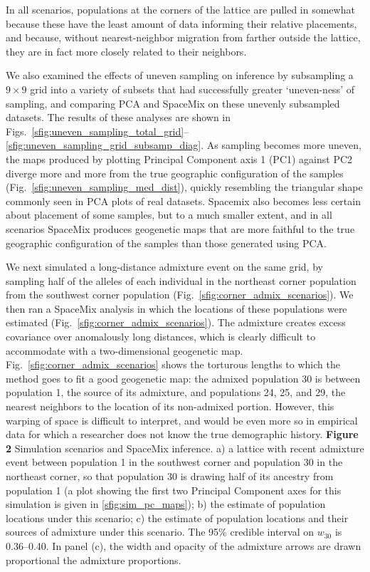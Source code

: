 \documentclass[10pt,letterpaper]{article}
\begin{document}
In all scenarios, populations at the corners of the lattice are pulled in somewhat
because these have the least amount of data informing their relative placements, and because, without nearest-neighbor migration from farther outside the lattice, they are in fact more closely related to their neighbors.  

We also examined the effects of uneven sampling on inference by 
subsampling a $9\times9$ grid into a variety of subsets that had successfully greater `uneven-ness' of sampling,
and comparing PCA and SpaceMix on these unevenly subsampled datasets.
The results of these analyses are shown in Figs.\ \ref{sfig:uneven_sampling_total_grid}--\ref{sfig:uneven_sampling_grid_subsamp_diag}.  
As sampling becomes more uneven,
the maps produced by plotting Principal Component axis 1 (PC1) against PC2 diverge more and more from 
the true geographic configuration of the samples (Fig.\ \ref{sfig:uneven_sampling_med_dist}),
quickly resembling the triangular shape commonly seen in PCA plots of real datasets.
Spacemix also becomes less certain about placement of some samples,
but to a much smaller extent, and in all scenarios SpaceMix produces geogenetic maps that are more 
faithful to the true geographic configuration of the samples than those generated using PCA. 

We next simulated a long-distance admixture event on the same grid,
by sampling half of the alleles of each individual in the northeast corner population from the southwest corner population (Fig.\ \ref{sfig:corner_admix_scenarios}).  We then ran a SpaceMix analysis in which the locations of these populations were estimated (Fig.\ \ref{sfig:corner_admix_scenarios}).
The admixture creates excess covariance over anomalously long distances, which is clearly difficult to accommodate with a two-dimensional geogenetic map.
Fig.\ \ref{sfig:corner_admix_scenarios} shows the torturous lengths to which the method goes to fit a good geogenetic map: the admixed population 30 is between population 1, the source of its admixture, and populations 24, 25, and 29, the nearest neighbors to the location of its non-admixed portion.
However, this warping of space is difficult to interpret, and would be even more so in empirical data for which a researcher does not know the true demographic history.  
%
\newline\newline
{\bf{Figure 2}} Simulation scenarios and SpaceMix inference.  a) a lattice with recent admixture event between population 1 in the southwest corner and population 30 in the northeast corner, so that population 30 is drawing half of its ancestry from population 1 (a plot showing the first two Principal Component axes for this simulation is given in \ref{sfig:sim_pc_maps}); b) the estimate of population locations under this scenario; c) the estimate of population locations and their sources of admixture under this scenario.  The 95\% credible interval on $w_{30}$ is 0.36--0.40. In panel (c), the width and opacity of the admixture arrows are drawn proportional the admixture proportions.
\newline\newline
\end{document}
